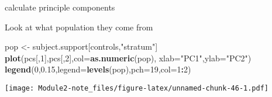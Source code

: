 \documentclass[]{article}
\newenvironment{Shaded}{\begin{snugshade}}{\end{snugshade}}
\newcommand{\KeywordTok}[1]{\textcolor[rgb]{0.13,0.29,0.53}{\textbf{#1}}}
\newcommand{\DataTypeTok}[1]{\textcolor[rgb]{0.13,0.29,0.53}{#1}}
\newcommand{\DecValTok}[1]{\textcolor[rgb]{0.00,0.00,0.81}{#1}}
\newcommand{\FloatTok}[1]{\textcolor[rgb]{0.00,0.00,0.81}{#1}}
\newcommand{\StringTok}[1]{\textcolor[rgb]{0.31,0.60,0.02}{#1}}
\newcommand{\OtherTok}[1]{\textcolor[rgb]{0.56,0.35,0.01}{#1}}
\newcommand{\OperatorTok}[1]{\textcolor[rgb]{0.81,0.36,0.00}{\textbf{#1}}}
\newcommand{\NormalTok}[1]{#1}
\begin{document}
\begin{Shaded}
\end{Shaded}

calculate principle components

\begin{Shaded}
\end{Shaded}

Look at what population they come from

\begin{Shaded}
\begin{Highlighting}[]
\NormalTok{pop <-}\StringTok{ }\NormalTok{subject.support[controls,}\StringTok{"stratum"}\NormalTok{]}
\KeywordTok{plot}\NormalTok{(pcs[,}\DecValTok{1}\NormalTok{],pcs[,}\DecValTok{2}\NormalTok{],}\DataTypeTok{col=}\KeywordTok{as.numeric}\NormalTok{(pop),}
     \DataTypeTok{xlab=}\StringTok{"PC1"}\NormalTok{,}\DataTypeTok{ylab=}\StringTok{"PC2"}\NormalTok{)}
\KeywordTok{legend}\NormalTok{(}\DecValTok{0}\NormalTok{,}\FloatTok{0.15}\NormalTok{,}\DataTypeTok{legend=}\KeywordTok{levels}\NormalTok{(pop),}\DataTypeTok{pch=}\DecValTok{19}\NormalTok{,}\DataTypeTok{col=}\DecValTok{1}\OperatorTok{:}\DecValTok{2}\NormalTok{)}
\end{Highlighting}
\end{Shaded}

\texttt{[image: Module2-note\_files/figure-latex/unnamed-chunk-46-1.pdf]}
\end{document}
